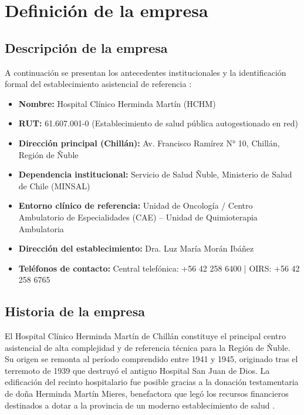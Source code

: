 \chapter{Definición de la empresa}

\section{Descripción de la empresa}

A continuación se presentan los antecedentes institucionales y la identificación formal del establecimiento asistencial de referencia \parencite{hchm2024web}:

\begin{itemize}
    \item \textbf{Nombre:} Hospital Clínico Herminda Martín (HCHM)
    \item \textbf{RUT:} 61.607.001-0 (Establecimiento de salud pública autogestionado en red)
    \item \textbf{Dirección principal (Chillán):} Av. Francisco Ramírez N° 10, Chillán, Región de Ñuble
    \item \textbf{Dependencia institucional:} Servicio de Salud Ñuble, Ministerio de Salud de Chile (MINSAL) \parencite{minsal2022plancancer}
    \item \textbf{Entorno clínico de referencia:} Unidad de Oncología / Centro Ambulatorio de Especialidades (CAE) -- Unidad de Quimioterapia Ambulatoria
    \item \textbf{Dirección del establecimiento:} Dra. Luz María Morán Ibáñez
    \item \textbf{Teléfonos de contacto:} Central telefónica: +56 42 258 6400 | OIRS: +56 42 258 6765
\end{itemize}

\section*{Historia de la empresa}
El Hospital Clínico Herminda Martín de Chillán constituye el principal centro asistencial de alta complejidad y de referencia técnica para la Región de Ñuble. Su origen se remonta al período comprendido entre 1941 y 1945, originado tras el terremoto de 1939 que destruyó el antiguo Hospital San Juan de Dios. La edificación del recinto hospitalario fue posible gracias a la donación testamentaria de doña Herminda Martín Mieres, benefactora que legó los recursos financieros destinados a dotar a la provincia de un moderno establecimiento de salud \parencite{hchm2024web}.

